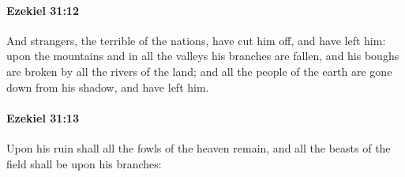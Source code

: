 		\paragraph{Ezekiel 31:12} %
			\label{EZEKIEL-31-12}

			And strangers, the terrible of the nations, have cut him off, and have left him: upon the mountains and in all the valleys his branches are fallen, and his boughs are broken by all the rivers of the land; and all the people of the earth are gone down from his shadow, and have left him.


		\paragraph{Ezekiel 31:13} %
			\label{EZEKIEL-31-13}

			Upon his ruin shall all the fowls of the heaven remain, and all the beasts of the field shall be upon his branches:

